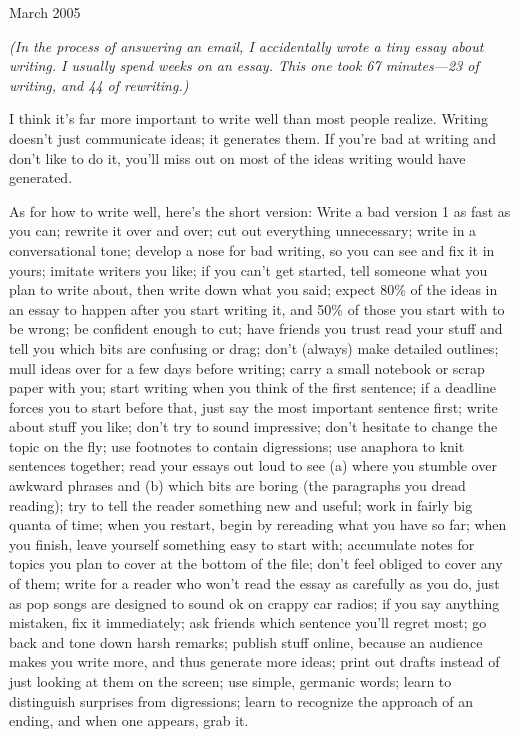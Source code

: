 March 2005

\emph{(In the process of answering an email, I accidentally wrote a tiny
essay about writing. I usually spend weeks on an essay. This one took 67
minutes---23 of writing, and 44 of rewriting.)}

I think it's far more important to write well than most people realize.
Writing doesn't just communicate ideas; it generates them. If you're bad
at writing and don't like to do it, you'll miss out on most of the ideas
writing would have generated.

As for how to write well, here's the short version: Write a bad version
1 as fast as you can; rewrite it over and over; cut out everything
unnecessary; write in a conversational tone; develop a nose for bad
writing, so you can see and fix it in yours; imitate writers you like;
if you can't get started, tell someone what you plan to write about,
then write down what you said; expect 80\% of the ideas in an essay to
happen after you start writing it, and 50\% of those you start with to
be wrong; be confident enough to cut; have friends you trust read your
stuff and tell you which bits are confusing or drag; don't (always) make
detailed outlines; mull ideas over for a few days before writing; carry
a small notebook or scrap paper with you; start writing when you think
of the first sentence; if a deadline forces you to start before that,
just say the most important sentence first; write about stuff you like;
don't try to sound impressive; don't hesitate to change the topic on the
fly; use footnotes to contain digressions; use anaphora to knit
sentences together; read your essays out loud to see (a) where you
stumble over awkward phrases and (b) which bits are boring (the
paragraphs you dread reading); try to tell the reader something new and
useful; work in fairly big quanta of time; when you restart, begin by
rereading what you have so far; when you finish, leave yourself
something easy to start with; accumulate notes for topics you plan to
cover at the bottom of the file; don't feel obliged to cover any of
them; write for a reader who won't read the essay as carefully as you
do, just as pop songs are designed to sound ok on crappy car radios; if
you say anything mistaken, fix it immediately; ask friends which
sentence you'll regret most; go back and tone down harsh remarks;
publish stuff online, because an audience makes you write more, and thus
generate more ideas; print out drafts instead of just looking at them on
the screen; use simple, germanic words; learn to distinguish surprises
from digressions; learn to recognize the approach of an ending, and when
one appears, grab it.
